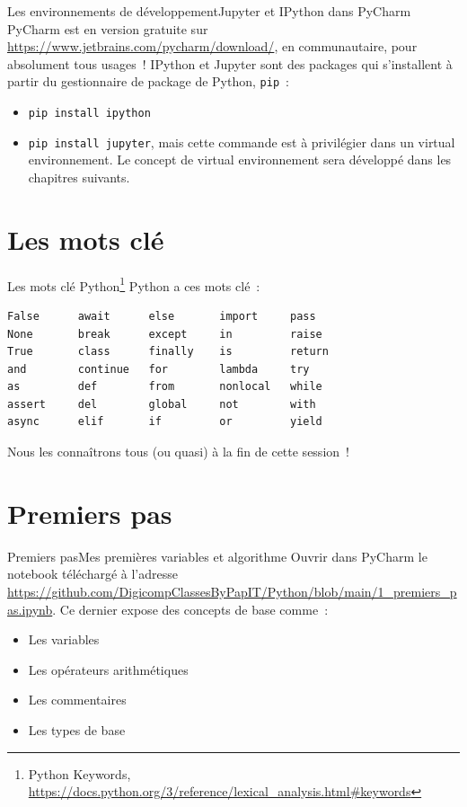 \documentclass{beamer}
\begin{document}
    \begin{frame}{Les environnements de développement}{Jupyter et IPython dans PyCharm}
        PyCharm est en version gratuite sur \url{https://www.jetbrains.com/pycharm/download/}, en communautaire, pour absolument tous usages~!
        \bigbreak
        IPython et Jupyter sont des packages qui s'installent à partir du gestionnaire de package de Python, \lstinline{pip}~:
        \begin{itemize}
            \item \lstinline{pip install ipython}
            \item \lstinline{pip install jupyter}, mais cette commande est à privilégier dans un virtual environnement.
            Le concept de virtual environnement sera développé dans les chapitres suivants.
        \end{itemize}
    \end{frame}


    \section{Les mots clé}\label{sec:keyword}

    \begin{frame}[fragile]{Les mots clé Python\footnote{Python Keywords, \url{https://docs.python.org/3/reference/lexical_analysis.html\#keywords}}}
        Python a ces mots clé~:
        \begin{verbatim}
False      await      else       import     pass
None       break      except     in         raise
True       class      finally    is         return
and        continue   for        lambda     try
as         def        from       nonlocal   while
assert     del        global     not        with
async      elif       if         or         yield
        \end{verbatim}
        Nous les connaîtrons tous (ou quasi) à la fin de cette session~!
    \end{frame}


    \section{Premiers pas}\label{sec:first-steps}
    \begin{frame}{Premiers pas}{Mes premières variables et algorithme}
        Ouvrir dans PyCharm le notebook téléchargé à l'adresse \url{https://github.com/DigicompClassesByPapIT/Python/blob/main/1_premiers_pas.ipynb}.
        \bigbreak
        Ce dernier expose des concepts de base comme~:
        \begin{itemize}
            \item Les variables
            \item Les opérateurs arithmétiques
            \item Les commentaires
            \item Les types de base
        \end{itemize}
    \end{frame}
\end{document}
